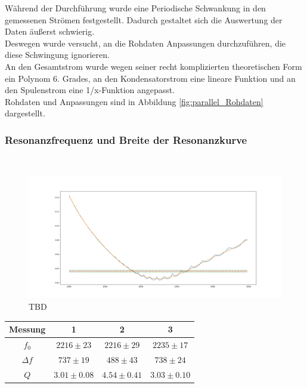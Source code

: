 \documentclass[12pt,a4paper]{article}
\begin{document}
Während der Durchführung wurde eine Periodische Schwankung in den gemessenen Strömen festgestellt. Dadurch gestaltet sich die Auswertung der Daten äußerst schwierig.\\
Deswegen wurde versucht, an die Rohdaten Anpassungen durchzuführen, die diese Schwingung ignorieren.\\
An den Gesamtstrom wurde wegen seiner recht komplizierten theoretischen Form ein Polynom 6. Grades, an den Kondensatorstrom eine lineare Funktion und an den Spulenstrom eine 1/x-Funktion angepasst.\\
Rohdaten und Anpassungen sind in Abbildung \ref{fig:parallel_Rohdaten} dargestellt.


\subsubsection{Resonanzfrequenz und Breite der Resonanzkurve}\mbox{}\\
\begin{figure}
\centering
\includegraphics[scale=0.4]{Bilder/Parallel_Iges.png}
\caption{TBD}
\label{fig:parallel_Iges}
\end{figure}

\begin{table}
\centering
\begin{tabular}{|c|c|c|c|}
\hline
Messung & 1&2&3\\
\hline
$f_0$ & $2216\pm 23 $ & $2216\pm 29 $ & $2235\pm 17$\\
\hline
$\Delta f$ & $737\pm 19 $ & $488\pm 43 $ & $738\pm 24$\\
\hline
$Q$ & $3.01\pm 0.08 $ & $4.54\pm 0.41 $ & $3.03\pm 0.10$\\
\hline
\end{tabular}
\label{tab:parallel_methode1}
\end{table}
\end{document}
